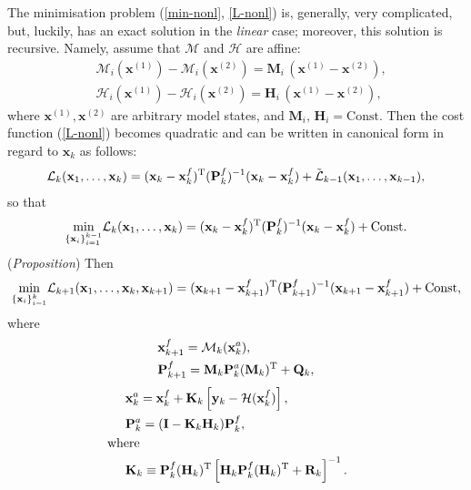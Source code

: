 \documentclass[11pt]{report}
\newcommand{\mb} {\mathbf}
\newcommand{\T}{^{\tiny \mathrm T}}
\begin{document}
The minimisation problem (\ref{min-nonl}, \ref{L-nonl}) is, generally, very complicated, but, luckily, has an exact solution in the \emph{linear} case; moreover, this solution is recursive.
Namely, assume that $\mathcal M$ and $\mathcal H$ are affine:
\begin{subequations}
  \label{lin}
  \begin{align}
    \label{lin-M}
    &\mathcal M_i(\mb x^{(1)}) - \mathcal M_i(\mb x^{(2)}) = \mb M_i \, (\mb x^{(1)} - \mb x^{(2)}),\\
    \label{lin-H}
    &\mathcal H_i(\mb x^{(1)}) - \mathcal H_i(\mb x^{(2)}) = \mb H_i \, (\mb x^{(1)} - \mb x^{(2)}),
  \end{align}
\end{subequations}
where $\mb x^{(1)}, \mb x^{(2)}$ are arbitrary model states, and $\mb M_i,\, \mb H_i = \mathrm{Const}$.
Then the cost function (\ref{L-nonl}) becomes quadratic and can be written in canonical form in regard to $\mb x_k$ as follows:
\begin{align*}
   \mathcal L_k(\mb x_1, \dots, \mb x_k) = (\mb x_k - \mb x_k^f)\T (\mb P_{k}^f)^{-1}(\mb x_k - \mb x_k^f) + \tilde{{\mathcal L}}_{k-1}(\mb x_1,\dots,\mb x_{k-1}),
\end{align*}
so that
\begin{align}
  \label{min-xk}
  \underset {\{\mb x_i\}_{i = 1}^{k - 1}}{\min} \mathcal L_k(\mb x_1, \dots, \mb x_k) = (\mb x_k - \mb x_k^f)\T (\mb P_{k}^f)^{-1}(\mb x_k - \mb x_k^f) + \mathrm{Const}.
\end{align}
(\emph{Proposition}) Then
\begin{align*}
    \underset {\{\mb x_i\}_{i = 1}^{k}}{\min} \mathcal L_{k+1}(\mb x_1, \dots, \mb x_k, \mb x_{k+1}) = (\mb x_{k+1} - \mb x_{k+1}^f)\T (\mb P_{k+1}^f)^{-1}(\mb x_{k+1} - \mb x_{k+1}^f) + \mathrm{Const},
\end{align*}
where
\begin{subequations}
  \label{kf-for}
  \begin{align}
    \label{prop-x}
    & \mb x^f_{k+1} = \mathcal M_k(\mb x_k^a),\\
    \label{prop-P}
    & \mb P_{k+1}^f = \mb M_k \mb P_k^a (\mb M_k)\T + \mb Q_k,
  \end{align}
\end{subequations}
\vspace{-5mm}
\begin{subequations}
  \label{kf-an}
  \begin{align}
    \label{kf-an-x}
    & \mb x_k^a = \mb x_k^f + \mb K_k \left [\mb y_k - \mathcal H(\mb x_k^f) \right ],\\
    \label{kf-an-P}
    & \mb P_k^a = (\mb I - \mb K_k \mb H_k) \mb P_k^f,\\
    \nonumber
    & \hspace{-0.5cm} \text{where}\\
    \label{kf-K}
    & \mb K_k \equiv \mb P^f_k (\mb H_k)\T \left [\mb H_k \mb P_k^f (\mb H_k)\T + \mb R_k \right ]^{-1}.
  \end{align}
\end{subequations}
\end{document}
